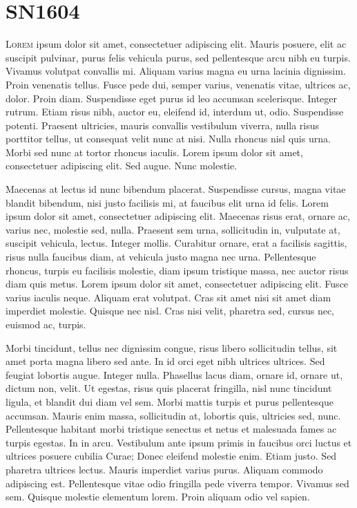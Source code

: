 \chapter{SN1604}
\label{chap:four}

\lettrine[lines=4]{L}{orem} ipsum dolor sit amet, consectetuer
adipiscing elit. Mauris posuere, elit ac suscipit pulvinar, purus
felis vehicula purus, sed pellentesque arcu nibh eu turpis. Vivamus
volutpat convallis mi. Aliquam varius magna eu urna lacinia
dignissim. Proin venenatis tellus. Fusce pede dui, semper varius,
venenatis vitae, ultrices ac, dolor. Proin diam. Suspendisse eget
purus id leo accumsan scelerisque. Integer rutrum. Etiam risus nibh,
auctor eu, eleifend id, interdum ut, odio. Suspendisse
potenti. Praesent ultricies, mauris convallis vestibulum viverra,
nulla risus porttitor tellus, ut consequat velit nunc at nisi. Nulla
rhoncus nisl quis urna. Morbi sed nunc at tortor rhoncus
iaculis. Lorem ipsum dolor sit amet, consectetuer adipiscing elit. Sed
augue. Nunc molestie.

Maecenas at lectus id nunc bibendum placerat. Suspendisse cursus,
magna vitae blandit bibendum, nisi justo facilisis mi, at faucibus
elit urna id felis. Lorem ipsum dolor sit amet, consectetuer
adipiscing elit. Maecenas risus erat, ornare ac, varius nec, molestie
sed, nulla. Praesent sem urna, sollicitudin in, vulputate at, suscipit
vehicula, lectus. Integer mollis. Curabitur ornare, erat a facilisis
sagittis, risus nulla faucibus diam, at vehicula justo magna nec
urna. Pellentesque rhoncus, turpis eu facilisis molestie, diam ipsum
tristique massa, nec auctor risus diam quis metus. Lorem ipsum dolor
sit amet, consectetuer adipiscing elit. Fusce varius iaculis
neque. Aliquam erat volutpat. Cras sit amet nisi sit amet diam
imperdiet molestie. Quisque nec nisl. Cras nisi velit, pharetra sed,
cursus nec, euismod ac, turpis.

Morbi tincidunt, tellus nec dignissim congue, risus libero
sollicitudin tellus, sit amet porta magna libero sed ante. In id orci
eget nibh ultrices ultrices. Sed feugiat lobortis augue. Integer
nulla. Phasellus lacus diam, ornare id, ornare ut, dictum non,
velit. Ut egestas, risus quis placerat fringilla, nisl nunc tincidunt
ligula, et blandit dui diam vel sem. Morbi mattis turpis et purus
pellentesque accumsan. Mauris enim massa, sollicitudin at, lobortis
quis, ultricies sed, nunc. Pellentesque habitant morbi tristique
senectus et netus et malesuada fames ac turpis egestas. In in
arcu. Vestibulum ante ipsum primis in faucibus orci luctus et ultrices
posuere cubilia Curae; Donec eleifend molestie enim. Etiam justo. Sed
pharetra ultrices lectus. Mauris imperdiet varius purus. Aliquam
commodo adipiscing est. Pellentesque vitae odio fringilla pede viverra
tempor. Vivamus sed sem. Quisque molestie elementum lorem. Proin
aliquam odio vel sapien.

